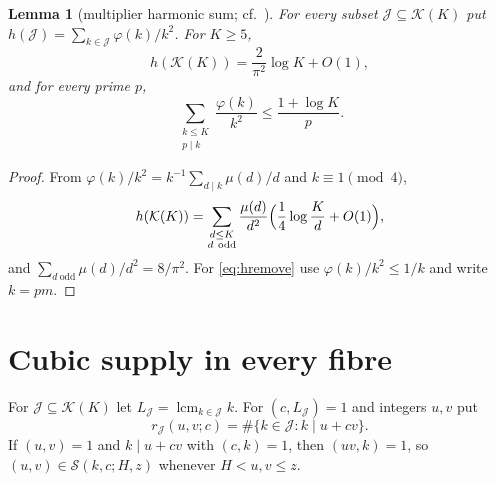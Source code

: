 \documentclass[10pt,reqno]{amsart}
\newtheorem{lemma}[theorem]{Lemma}
\theoremstyle{remark}
\newcommand{\K}{\mathcal K}
\newcommand{\J}{\mathcal J}
\newcommand{\Sset}{\mathcal S}
\newcommand{\lcm}{\operatorname{lcm}}
\begin{document}
\begin{lemma}[multiplier harmonic sum; cf.\ {\cite[Lemma~3.2]{LL}}]\label{lem:h}
For every subset $\J\subseteq\K(K)$ put
$h(\J)=\sum_{k\in\J}\varphi(k)/k^2$.  For $K\geq5$,
\begin{equation}\label{eq:hfull}
 h(\K(K))=\frac2{\pi^2}\log K+O(1),
\end{equation}
and for every prime $p$,
\begin{equation}\label{eq:hremove}
 \sum_{\substack{k\leq K\\p\mid k}}\frac{\varphi(k)}{k^2}\leq\frac{1+\log K}p.
\end{equation}
\end{lemma}
\begin{proof}
From $\varphi(k)/k^2=k^{-1}\sum_{d\mid k}\mu(d)/d$ and $k\equiv1\pmod4$,
\[
 h(\K(K))=\sum_{\substack{d\leq K\\d\ \mathrm{odd}}}\frac{\mu(d)}{d^2}
 \Bigl(\frac14\log\frac Kd+O(1)\Bigr),
\]
and $\sum_{d\ \mathrm{odd}}\mu(d)/d^2=8/\pi^2$.  For \eqref{eq:hremove}
use $\varphi(k)/k^2\leq1/k$ and write $k=pm$.
\end{proof}

\section{Cubic supply in every fibre}\label{sec:supply}
For $\J\subseteq\K(K)$ let $L_\J=\lcm_{k\in\J}k$.  For $(c,L_\J)=1$ and
integers $u,v$ put
\[
 r_\J(u,v;c)=\#\{k\in\J:k\mid u+cv\}.
\]
If $(u,v)=1$ and $k\mid u+cv$ with $(c,k)=1$, then $(uv,k)=1$, so
$(u,v)\in\Sset(k,c;H,z)$ whenever $H<u,v\leq z$.
\end{document}
